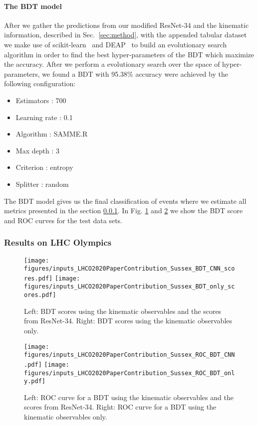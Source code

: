\documentclass[a4paper,11pt]{article}
\begin{document}
\paragraph{The BDT model}
After we gather the predictions from our modified ResNet-34 and the kinematic information, described in Sec.~\ref{sec:method}, with the appended tabular dataset we make use of scikit-learn~\cite{scikit-learn} and DEAP~\cite{DEAP_JMLR2012} to build an evolutionary search algorithm in order to find the best hyper-parameters of the BDT which maximize the accuracy. After we perform a evolutionary search over the space of hyper-parameters, we found a BDT with 95.38\% accuracy were achieved by the following configuration:
\begin{itemize}
    \item Estimators : 700 
    \item Learning rate : 0.1 
    \item Algorithm : SAMME.R 
    \item Max depth : 3 
    \item Criterion : entropy 
    \item Splitter : random
\end{itemize}
The BDT model gives us the final classification of events where we estimate all metrics presented in the section \ref{sec:results}. In Fig. \ref{fig:BDT_CNN} and \ref{fig:ROC_BDT_CNN} we show the BDT score and ROC curves for the test data sets. 
\subsubsection{Results on LHC Olympics}
\label{sec:results}
\begin{figure}[h!]
\centering
\texttt{[image: figures/inputs\_LHCO2020PaperContribution\_Sussex\_BDT\_CNN\_scores.pdf]}
\texttt{[image: figures/inputs\_LHCO2020PaperContribution\_Sussex\_BDT\_only\_scores.pdf]}
\caption{Left: BDT scores using the kinematic observables and the scores from ResNet-34. Right: BDT scores using the kinematic observables only.} 
\label{fig:BDT_CNN}
\end{figure}

\begin{figure}[ht!]
\centering
\texttt{[image: figures/inputs\_LHCO2020PaperContribution\_Sussex\_ROC\_BDT\_CNN.pdf]}
\texttt{[image: figures/inputs\_LHCO2020PaperContribution\_Sussex\_ROC\_BDT\_only.pdf]}
\caption{Left: ROC curve for a BDT using the kinematic observables and the scores from ResNet-34.
Right: ROC curve for a BDT using the kinematic observables only.} 
\label{fig:ROC_BDT_CNN}
\end{figure}
\end{document}
